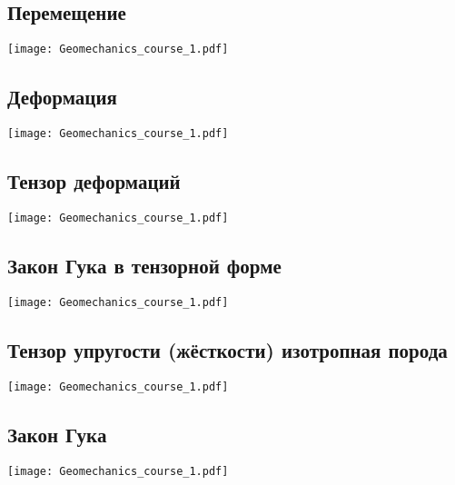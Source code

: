 \documentclass[main.tex]{subfiles}
\begin{document}
\subsection{Перемещение}

\begin{center}
\texttt{[image: Geomechanics\_course\_1.pdf]}
\end{center}

\subsection{Деформация}

\begin{center}
\texttt{[image: Geomechanics\_course\_1.pdf]}
\end{center}

\subsection{Тензор деформаций}

\begin{center}
\texttt{[image: Geomechanics\_course\_1.pdf]}
\end{center}

\subsection{Закон Гука в тензорной форме}

\begin{center}
\texttt{[image: Geomechanics\_course\_1.pdf]}
\end{center}

\subsection{Тензор упругости (жёсткости) изотропная порода}

\begin{center}
\texttt{[image: Geomechanics\_course\_1.pdf]}
\end{center}

\subsection{Закон Гука}

\begin{center}
\texttt{[image: Geomechanics\_course\_1.pdf]}
\end{center}
\end{document}
